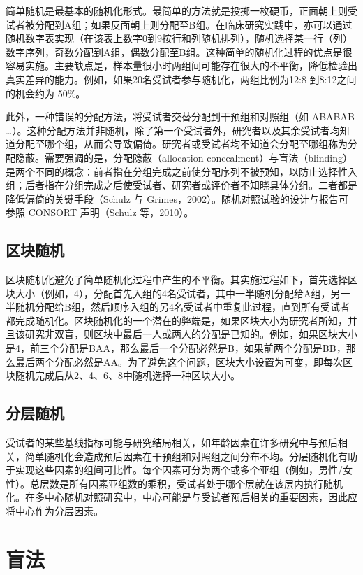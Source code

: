 \documentclass[
  chinese-hans,
  letterpaper,
  DIV=11,
  numbers=noendperiod]{scrreprt}
\begin{document}
简单随机是最基本的随机化形式。最简单的方法就是投掷一枚硬币，正面朝上则受试者被分配到A组；如果反面朝上则分配至B组。在临床研究实践中，亦可以通过随机数字表实现（在该表上数字0到9按行和列随机排列），随机选择某一行（列）数字序列，奇数分配到A组，偶数分配至B组。这种简单的随机化过程的优点是很容易实施。主要缺点是，样本量很小时两组间可能存在很大的不平衡，降低检验出真实差异的能力。例如，如果20名受试者参与随机化，两组比例为12:8
到8:12之间的机会约为 50\%。

此外，一种错误的分配方法，将受试者交替分配到干预组和对照组（如 ABABAB
\ldots）。这种分配方法并非随机，除了第一个受试者外，研究者以及其余受试者均知道分配至哪个组，从而会导致偏倚。研究者或受试者均不知道会分配至哪组称为分配隐蔽。需要强调的是，分配隐蔽（allocation
concealment）与盲法（blinding）是两个不同的概念：前者指在分组完成之前使分配序列不被预知，以防止选择性入组；后者指在分组完成之后使受试者、研究者或评价者不知晓具体分组。二者都是降低偏倚的关键手段（Schulz
与 Grimes，2002）。随机对照试验的设计与报告可参照 CONSORT 声明（Schulz
等，2010）。

\subsection{区块随机}\label{ux533aux5757ux968fux673a}

区块随机化避免了简单随机化过程中产生的不平衡。其实施过程如下，首先选择区块大小（例如，4），分配首先入组的4名受试者，其中一半随机分配给A组，另一半随机分配给B组，然后顺序入组的另4名受试者中重复此过程，直到所有受试者都完成随机化。区块随机化的一个潜在的弊端是，如果区块大小为研究者所知，并且该研究非双盲，则区块中最后一人或两人的分配是已知的。例如，如果区块大小是4，前三个分配是BAA，那么最后一个分配必然是B，如果前两个分配是BB，那么最后两个分配必然是AA。为了避免这个问题，区块大小设置为可变，即每次区块随机完成后从2、4、6、8中随机选择一种区块大小。

\subsection{分层随机}\label{ux5206ux5c42ux968fux673a}

受试者的某些基线指标可能与研究结局相关，如年龄因素在许多研究中与预后相关，简单随机化会造成预后因素在干预组和对照组之间分布不均。分层随机化有助于实现这些因素的组间可比性。每个因素可分为两个或多个亚组（例如，男性/女性）。总层数是所有因素亚组数的乘积，受试者处于哪个层就在该层内执行随机化。在多中心随机对照研究中，中心可能是与受试者预后相关的重要因素，因此应将中心作为分层因素。

\section{盲法}\label{ux76f2ux6cd5}
\end{document}
